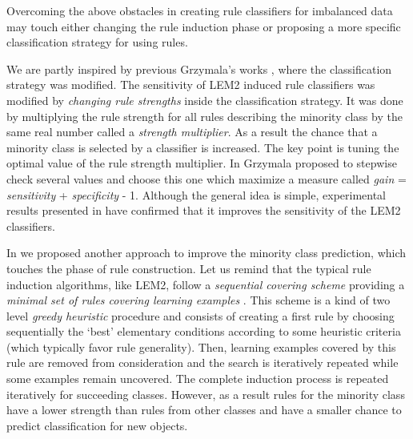 \documentclass{AIMeth05}
\begin{document}
Overcoming the above obstacles in creating rule classifiers for imbalanced
data may touch either changing the rule induction phase or proposing a more
specific classification strategy for using rules.

We are partly inspired by previous Grzymala's works
\cite{Grzymala99,Grzymala00}, where the classification strategy was
modified.  The sensitivity of LEM2 induced \cite{LEM2} rule classifiers was
modified by {\em changing rule strengths} inside the classification
strategy. It was done by multiplying the rule strength for all rules
describing the minority class by the same real number called a
\emph{strength multiplier}. As a result the chance that a minority class is
selected by a classifier is increased. The key point is tuning  the optimal
value of the rule strength multiplier. In \cite{Grzymala99} Grzymala
proposed to stepwise check several values and choose this one which maximize
a measure called {\em gain} = {\em sensitivity} + {\em specificity} - 1.
Although the general idea is simple, experimental results presented in
\cite{Grzymala99,Grzymala00,GrzymJSW} have confirmed that it improves the
sensitivity of the LEM2 classifiers.

In \cite{GrzymJSW} we proposed another approach to improve the minority
class prediction, which touches the phase of rule construction. Let us
remind that the typical rule induction algorithms, like LEM2, follow a {\em
sequential covering scheme} providing a {\em minimal set of rules covering
learning examples} \cite{Stef01hab}. This scheme is a kind of two level {\em
greedy heuristic} procedure and consists of creating a first rule by
choosing sequentially the `best' elementary conditions according to some
heuristic criteria (which typically favor rule generality). Then, learning
examples covered by this rule are removed from consideration and the search
is iteratively repeated while some examples remain uncovered. The complete
induction process is repeated iteratively for succeeding classes. However,
as a result  rules for the minority class have a lower strength than rules
from other classes and have a smaller chance to predict classification for
new objects.
\end{document}
